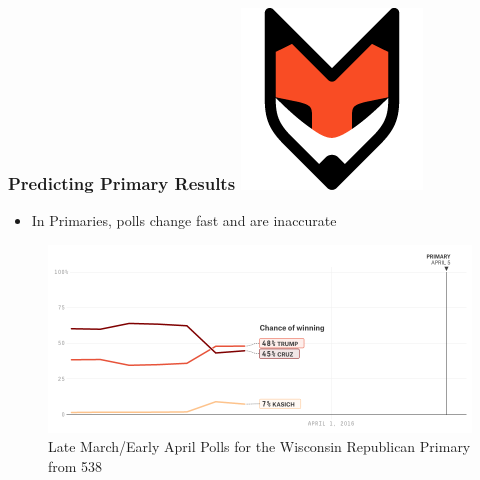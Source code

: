 \documentclass[xcolor=dvipsnames]{beamer}
\begin{document}
\begin{frame}
\frametitle{Predicting Primary Results \hfill \includegraphics[scale=.15]{images/fivethirtyeight-logo}}

\begin{itemize}
\item In Primaries, polls change fast and are inaccurate	
\end{itemize}


\begin{figure}
\includegraphics[scale=.35]{poll2.png}
\caption{Late March/Early April Polls for the Wisconsin Republican Primary from 538}
\end{figure}

\end{frame}
\end{document}
